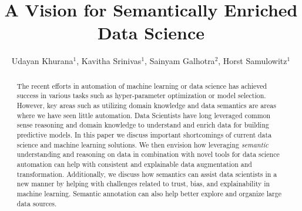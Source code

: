 \documentclass[sigconf, nonacm]{acmart}
\begin{document}

\title{A Vision for Semantically Enriched Data Science}


\author{Udayan Khurana$^1$, Kavitha Srinivas$^1$, Sainyam Galhotra$^2$, Horst Samulowitz$^1$}





\begin{abstract}
  The recent efforts in automation of machine learning or data science has achieved success in various tasks such as hyper-parameter optimization or model selection. However, key areas such as utilizing domain knowledge and data semantics are areas where we have seen little automation. 
 Data Scientists have long leveraged common sense reasoning and domain knowledge to understand and enrich data for building predictive models.
  In this paper we discuss important shortcomings of current data science and machine learning solutions. We then envision how leveraging {\em semantic} understanding and reasoning on data in combination with novel tools for data science automation can help with consistent and explainable data augmentation and transformation. Additionally, we discuss how semantics can assist data scientists in a new manner by helping with challenges related to trust, bias, and explainability in machine learning. Semantic annotation can also help better explore and organize large data sources.
\end{abstract}
\end{document}
